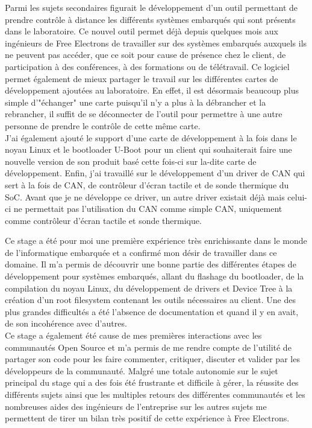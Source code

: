 Parmi les sujets secondaires figurait le développement d'un outil permettant de prendre contrôle à distance les différents systèmes embarqués qui sont présents dans le laboratoire. Ce nouvel outil permet déjà depuis quelques mois aux ingénieurs de Free Electrons de travailler sur des systèmes embarqués auxquels ils ne peuvent pas accéder, que ce soit pour cause de présence chez le client, de participation à des conférences, à des formations ou de télétravail. Ce logiciel permet également de mieux partager le travail sur les différentes cartes de développement ajoutées au laboratoire. En effet, il est désormais beaucoup plus simple d'"échanger" une carte puisqu'il n'y a plus à la débrancher et la rebrancher, il suffit de se déconnecter de l'outil pour permettre à une autre personne de prendre le contrôle de cette même carte.\\
J'ai également ajouté le support d'une carte de développement à la fois dans le noyau Linux et le bootloader U-Boot pour un client qui souhaiterait faire une nouvelle version de son produit basé cette fois-ci sur la-dite carte de développement. Enfin, j'ai travaillé sur le développement d'un driver de CAN qui sert à la fois de CAN, de contrôleur d'écran tactile et de sonde thermique du SoC. Avant que je ne développe ce driver, un autre driver existait déjà mais celui-ci ne permettait pas l'utilisation du CAN comme simple CAN, uniquement comme contrôleur d'écran tactile et sonde thermique.

Ce stage a été pour moi une première expérience très enrichissante dans le monde de l'informatique embarquée et a confirmé mon désir de travailler dans ce domaine. Il m'a permis de découvrir une bonne partie des différentes étapes de développement pour systèmes embarqués, allant du flashage du bootloader, de la compilation du noyau Linux, du développement de drivers et Device Tree à la création d'un root filesystem contenant les outils nécessaires au client. Une des plus grandes difficultés a été l'absence de documentation et quand il y en avait, de son incohérence avec d'autres.\\
Ce stage a également été cause de mes premières interactions avec les communautés Open Source et m'a permis de me rendre compte de l'utilité de partager son code pour les faire commenter, critiquer, discuter et valider par les développeurs de la communauté. Malgré une totale autonomie sur le sujet principal du stage qui a des fois été frustrante et difficile à gérer, la réussite des différents sujets ainsi que les multiples retours des différentes communautés et les nombreuses aides des ingénieurs de l'entreprise sur les autres sujets me permettent de tirer un bilan très positif de cette expérience à Free Electrons.
